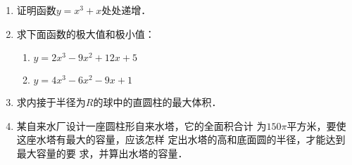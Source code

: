 \begin{ex}
\begin{enumerate}
    \item 证明函数$y=x^3+x$处处递增．
    \item 求下面函数的极大值和极小值：
\begin{enumerate}
    \item $y=2x^3-9x^2+12x+5$
    \item $y=4x^3-6x^2-9x+1$
\end{enumerate}
    \item 求内接于半径为$R$的球中的直圆柱的最大体积．
    \item 某自来水厂设计一座圆柱形自来水塔，它的全面积合计
    为$150\pi$平方米，要使这座水塔有最大的容量，应该怎样
    定出水塔的高和底面圆的半径，才能达到最大容量的要
    求，并算出水塔的容量．
\end{enumerate}
\end{ex}

